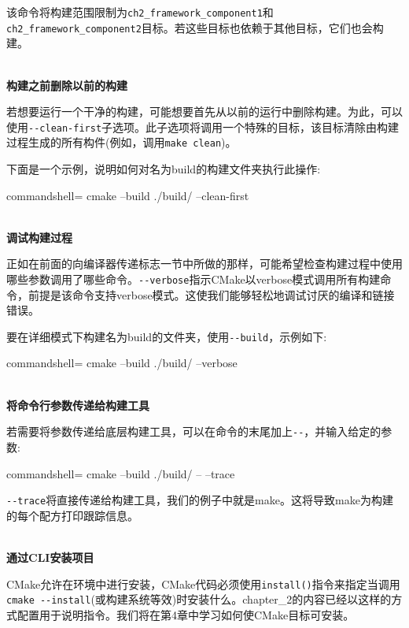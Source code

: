 该命令将构建范围限制为\texttt{ch2\_framework\_component1}和\texttt{ch2\_framework\_component2}目标。若这些目标也依赖于其他目标，它们也会构建。

\hspace*{\fill} \\ %
\noindent
\textbf{构建之前删除以前的构建}

若想要运行一个干净的构建，可能想要首先从以前的运行中删除构建。为此，可以使用\texttt{-{}-clean-first}子选项。此子选项将调用一个特殊的目标，该目标清除由构建过程生成的所有构件(例如，调用\texttt{make clean})。

下面是一个示例，说明如何对名为build的构建文件夹执行此操作:

\begin{tcblisting}{commandshell={}}
cmake --build ./build/ --clean-first
\end{tcblisting}

\hspace*{\fill} \\ %
\noindent
\textbf{调试构建过程}

正如在前面的向编译器传递标志一节中所做的那样，可能希望检查构建过程中使用哪些参数调用了哪些命令。\texttt{-{}-verbose}指示CMake以verbose模式调用所有构建命令，前提是该命令支持verbose模式。这使我们能够轻松地调试讨厌的编译和链接错误。

要在详细模式下构建名为build的文件夹，使用\texttt{-{}-build}，示例如下:

\begin{tcblisting}{commandshell={}}
cmake --build ./build/ --verbose
\end{tcblisting}

\hspace*{\fill} \\ %
\noindent
\textbf{将命令行参数传递给构建工具}

若需要将参数传递给底层构建工具，可以在命令的末尾加上\texttt{-{}-}，并输入给定的参数:

\begin{tcblisting}{commandshell={}}
cmake --build ./build/ -- --trace
\end{tcblisting}

\texttt{-{}-trace}将直接传递给构建工具，我们的例子中就是make。这将导致make为构建的每个配方打印跟踪信息。

\hspace*{\fill} \\ %
\noindent
\textbf{通过CLI安装项目}

CMake允许在环境中进行安装，CMake代码必须使用\texttt{install()}指令来指定当调用\texttt{cmake -{}-install}(或构建系统等效)时安装什么。chapter\_2的内容已经以这样的方式配置用于说明指令。我们将在第4章中学习如何使CMake目标可安装。

